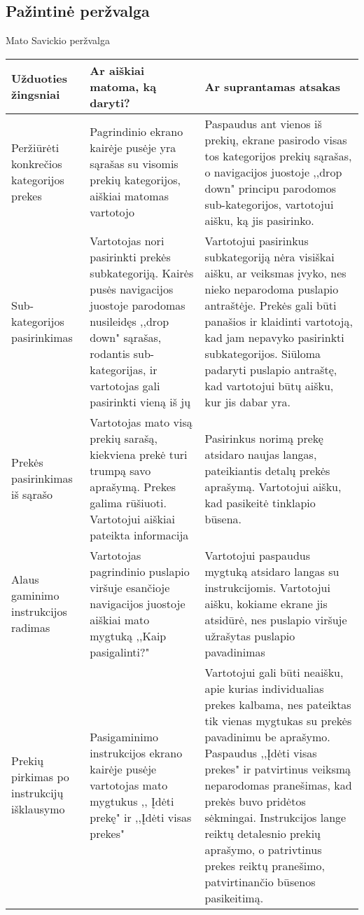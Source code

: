\documentclass[oneside]{VUMIFPSkursinis}
\begin{document}
	\subsection{Pažintinė peržvalga}
Mato Savickio peržvalga
\begin{center}
    \begin{tabular}{ |p{4cm}| p{6cm} | p{7cm} | }
    \hline
    	Užduoties žingsniai & Ar aiškiai matoma, ką daryti? & Ar suprantamas atsakas \\ \hline 
	Peržiūrėti konkrečios kategorijos prekes & Pagrindinio ekrano kairėje pusėje yra sąrašas su visomis prekių kategorijos, aiškiai matomas vartotojo & Paspaudus ant vienos iš prekių, ekrane pasirodo visas tos kategorijos prekių sąrašas, o navigacijos juostoje ,,drop down" principu parodomos sub-kategorijos, vartotojui aišku, ką jis pasirinko. \\ \hline
	Sub-kategorijos pasirinkimas & Vartotojas nori pasirinkti prekės subkategoriją. Kairės pusės navigacijos juostoje parodomas nusileidęs ,,drop down" sąrašas, rodantis sub-kategorijas, ir vartotojas gali pasirinkti vieną iš jų & Vartotojui pasirinkus subkategoriją nėra visiškai aišku, ar veiksmas įvyko, nes nieko neparodoma puslapio antraštėje. Prekės gali būti panašios ir klaidinti vartotoją, kad jam nepavyko pasirinkti subkategorijos. Siūloma padaryti puslapio antraštę, kad vartotojui būtų aišku, kur jis dabar yra. \\ \hline
	Prekės pasirinkimas iš sąrašo & Vartotojas mato visą prekių sarašą, kiekviena prekė turi trumpą savo aprašymą. 
	Prekes galima rūšiuoti. Vartotojui aiškiai pateikta informacija & Pasirinkus norimą prekę atsidaro naujas langas, pateikiantis detalų prekės aprašymą. 
Vartotojui aišku, kad pasikeitė tinklapio būsena. \\ \hline
	Alaus gaminimo instrukcijos radimas & Vartotojas pagrindinio puslapio viršuje esančioje navigacijos juostoje aiškiai mato mygtuką ,,Kaip pasigalinti?" & Vartotojui paspaudus mygtuką atsidaro langas su instrukcijomis. Vartotojui aišku, kokiame ekrane jis atsidūrė, nes puslapio viršuje užrašytas puslapio pavadinimas \\ \hline
	Prekių pirkimas po instrukcijų išklausymo & Pasigaminimo instrukcijos ekrano kairėje pusėje vartotojas mato mygtukus ,, Įdėti prekę" ir ,,Įdėti visas prekes" & Vartotojui gali būti neaišku, apie kurias individualias prekes kalbama, nes pateiktas tik vienas mygtukas su prekės pavadinimu be aprašymo.
	Paspaudus ,,Įdėti visas prekes" ir patvirtinus veiksmą neparodomas pranešimas, kad prekės buvo pridėtos sėkmingai. Instrukcijos lange reiktų detalesnio prekių aprašymo, o patrivtinus prekes reiktų pranešimo, patvirtinančio būsenos pasikeitimą. \\ \hline
	
   \hline
    \end{tabular}
\end{center}
\end{document}
